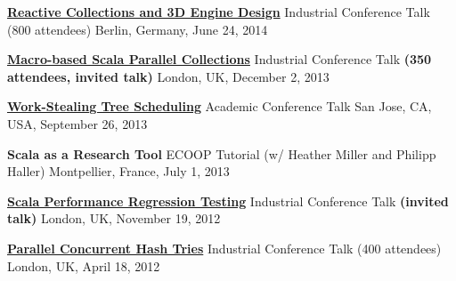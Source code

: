 \documentclass[9pt]{article}
\begin{document}
\noindent\href{https://www.parleys.com/tutorial/53a7d2cde4b0543940d9e561/chapter1/about}
{\bf Reactive Collections and 3D Engine Design}
\vspace{-0.03in}
\newline\noindent Industrial Conference Talk (800 attendees)
\dates{}
\linebreak\noindent Berlin, Germany, June 24, 2014
\bigskip

\noindent
\href{http://skillsmatter.com/podcast/scala/macro-based-scala-parallel-collections}
{\bf Macro-based Scala Parallel Collections}
\vspace{-0.03in}
\newline\noindent Industrial Conference Talk \textbf{(350 attendees, invited talk)}
\dates{}
\linebreak\noindent London, UK, December 2, 2013
\bigskip

\noindent\href{http://axel22.github.io/resources/docs/lcpc13.pptx}
{\bf Work-Stealing Tree Scheduling}
\vspace{-0.03in}
\newline\noindent Academic Conference Talk
\dates{}
\linebreak\noindent San Jose, CA, USA, September 26, 2013
\bigskip

\noindent
{\bf Scala as a Research Tool}
\vspace{-0.03in}
\newline\noindent ECOOP Tutorial
                  (w/ Heather Miller and Philipp Haller)
\dates{}
\linebreak\noindent Montpellier, France, July 1, 2013
\bigskip

\noindent
\href{https://skillsmatter.com/skillscasts/3701-scala-performance-regression-testing}
{\bf Scala Performance Regression Testing}
\vspace{-0.03in}
\newline\noindent Industrial Conference Talk \textbf{(invited talk)}
\dates{}
\linebreak\noindent London, UK, November 19, 2012
\bigskip

\noindent\href{https://skillsmatter.com/skillscasts/3234-parallel-concurrent-hash-tries}
{\bf Parallel Concurrent Hash Tries}
\vspace{-0.03in}
\newline\noindent Industrial Conference Talk (400 attendees)
\dates{}
\linebreak\noindent London, UK, April 18, 2012
\bigskip
\end{document}
